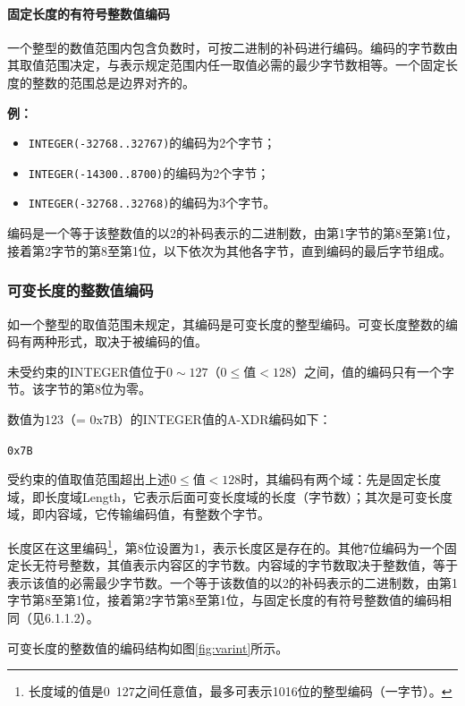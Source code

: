 \documentclass[a4paper,11pt]{ctexart}
\begin{document}
\paragraph{固定长度的有符号整数值编码}

一个整型的数值范围内包含负数时，可按二进制的补码进行编码。编码的字节数由其取值范围决定，与表示规定范围内任一取值必需的最少字节数相等。一个固定长度的整数的范围总是边界对齐的。

\noindent\textbf{例：}
\begin{itemize}[leftmargin=2em]
\item \texttt{INTEGER(-32768..32767)}的编码为2个字节；
\item \texttt{INTEGER(-14300..8700)}的编码为2个字节；
\item \texttt{INTEGER(-32768..32768)}的编码为3个字节。
\end{itemize}

编码是一个等于该整数值的以2的补码表示的二进制数，由第1字节的第8至第1位，接着第2字节的第8至第1位，以下依次为其他各字节，直到编码的最后字节组成。

\subsubsection{可变长度的整数值编码}

如一个整型的取值范围未规定，其编码是可变长度的整型编码。可变长度整数的编码有两种形式，取决于被编码的值。

未受约束的INTEGER值位于$0 \sim 127$（$0 \leqslant \text{值} < 128$）之间，值的编码只有一个字节。该字节的第8位为零。

数值为123（= 0x7B）的INTEGER值的A-XDR编码如下：

\begin{center}
\texttt{0x7B}
\end{center}

受约束的值取值范围超出上述$0 \leqslant \text{值} < 128$时，其编码有两个域：先是固定长度域，即长度域Length，它表示后面可变长度域的长度（字节数）；其次是可变长度域，即内容域，它传输编码值，有整数个字节。

长度区在这里编码\footnote{长度域的值是0~127之间任意值，最多可表示1016位的整型编码（一字节）。}，第8位设置为1，表示长度区是存在的。其他7位编码为一个固定长无符号整数，其值表示内容区的字节数。内容域的字节数取决于整数值，等于表示该值的必需最少字节数。一个等于该数值的以2的补码表示的二进制数，由第1字节第8至第1位，接着第2字节第8至第1位，与固定长度的有符号整数值的编码相同（见6.1.1.2）。

可变长度的整数值的编码结构如图\ref{fig:varint}所示。
\end{document}
